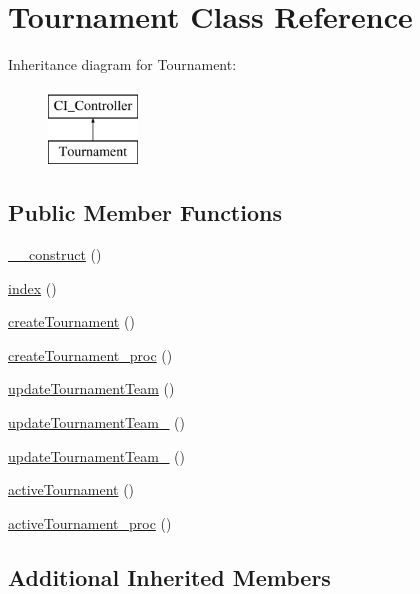 \hypertarget{class_tournament}{}\section{Tournament Class Reference}
\label{class_tournament}
Inheritance diagram for Tournament\+:\begin{figure}[H]
\begin{center}
\leavevmode
\includegraphics[height=2.000000cm]{class_tournament}
\end{center}
\end{figure}
\subsection*{Public Member Functions}
\begin{DoxyCompactItemize}
\item 
\hyperlink{class_tournament_a095c5d389db211932136b53f25f39685}{\+\_\+\+\_\+construct} ()
\item 
\hyperlink{class_tournament_a149eb92716c1084a935e04a8d95f7347}{index} ()
\item 
\hyperlink{class_tournament_a22a9c049fc1a948708f23105fd90f685}{create\+Tournament} ()
\item 
\hyperlink{class_tournament_a258d321bb541581a060c06bff82dc443}{create\+Tournament\+\_\+proc} ()
\item 
\hyperlink{class_tournament_ab528185ac92a048cd086565639855be7}{update\+Tournament\+Team} ()
\item 
\hyperlink{class_tournament_a29368ac0a9b84e181d55e99bf1da18bb}{update\+Tournament\+Team\+\_} ()
\item 
\hyperlink{class_tournament_a4c3f1c62c6f23834ea67d37e47435f22}{update\+Tournament\+Team\+\_} ()
\item 
\hyperlink{class_tournament_a363c07610c8cf7d3a5fe5a7fb75e8487}{active\+Tournament} ()
\item 
\hyperlink{class_tournament_a14f75718271a22e16794ef2fdb642f01}{active\+Tournament\+\_\+proc} ()
\end{DoxyCompactItemize}
\subsection*{Additional Inherited Members}


